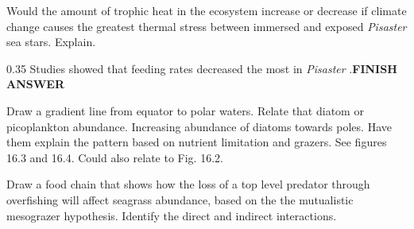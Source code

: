 \question[10]
Would the amount of trophic heat in the ecosystem increase or decrease if climate change causes the greatest thermal stress between immersed and exposed \textit{Pisaster} sea stars.  Explain.

	\begin{AnswerPage}{0.35\textheight}%
	Studies showed that feeding rates decreased the most in \textit{Pisaster} .\textbf{FINISH ANSWER}
	
	\end{AnswerPage}




\question[5] %
Draw a gradient line from equator to polar waters. Relate that diatom or picoplankton abundance. Increasing abundance of diatoms towards poles.  Have them explain the pattern based on nutrient limitation and grazers.  See figures 16.3 and 16.4.  Could also relate to Fig. 16.2.



\question[10]
Draw a food chain that shows how the loss of a top level predator through overfishing will affect seagrass abundance, based on the the mutualistic mesograzer hypothesis. Identify the direct and indirect interactions.